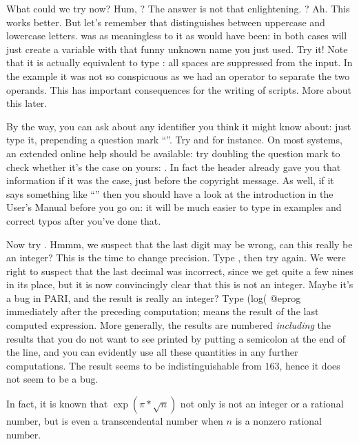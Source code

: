 What could we try now? Hum, ? The answer is not that
enlightening. ? Ah. This works better. But let's remember that
 distinguishes between uppercase and lowercase letters.  was
as meaningless to it as  would have been: in both cases
 will just create a variable with that funny unknown name you just
used. Try it! Note that it is actually equivalent to type
: all spaces are suppressed from the input. In the
 example  it was not so conspicuous as we had an operator to
separate the two operands. This has important consequences for the writing of
 scripts. More about this later.

By the way, you can ask  about any identifier you think it might know
about: just type it, prepending a question mark ``''. Try 
and  for instance. On most systems, an extended online help should
be available: try doubling the question mark to check whether it's the case
on yours: . In fact the  header already gave you that
information if it was the case, just before the copyright message. As well,
if it says something like ``'' then you should have a
look at the  introduction in the User's Manual before you go
on: it will be much easier to type in examples and correct typos after you've
done that.

Now try . Hmmm, we suspect that the last digit may
be wrong, can this really be an integer? This is the time to change
precision. Type , then try  again. We
were right to suspect that the last decimal was incorrect, since we get quite
a few nines in its place, but it is now convincingly clear that this is not
an integer. Maybe it's a bug in PARI, and the result is really an integer?
Type
\bprog
  (log(%
@eprog\noindent
immediately after the preceding computation; \kbd{\%} means the result of the
last computed expression. More generally, the results are numbered  \emph{including} the results
that you do not want to see printed by putting a semicolon at the end of the
line, and you can evidently use all these quantities in any further
computations. The result seems to be indistinguishable from $163$, hence it
does not seem to be a bug.

In fact, it is known that $\exp(\pi*\sqrt{n})$ not only is not an integer or
a rational number, but is even a transcendental number when $n$ is a nonzero
rational number.

